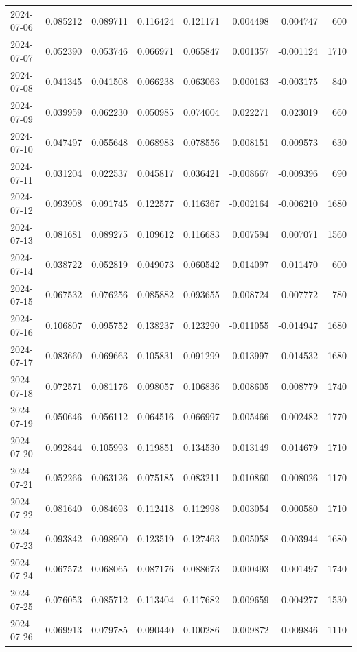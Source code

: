 \begin{tabular}{lrrrrrrr}
2024-07-06 & 0.085212 & 0.089711 & 0.116424 & 0.121171 & 0.004498 & 0.004747 & 600 \\
2024-07-07 & 0.052390 & 0.053746 & 0.066971 & 0.065847 & 0.001357 & -0.001124 & 1710 \\
2024-07-08 & 0.041345 & 0.041508 & 0.066238 & 0.063063 & 0.000163 & -0.003175 & 840 \\
2024-07-09 & 0.039959 & 0.062230 & 0.050985 & 0.074004 & 0.022271 & 0.023019 & 660 \\
2024-07-10 & 0.047497 & 0.055648 & 0.068983 & 0.078556 & 0.008151 & 0.009573 & 630 \\
2024-07-11 & 0.031204 & 0.022537 & 0.045817 & 0.036421 & -0.008667 & -0.009396 & 690 \\
2024-07-12 & 0.093908 & 0.091745 & 0.122577 & 0.116367 & -0.002164 & -0.006210 & 1680 \\
2024-07-13 & 0.081681 & 0.089275 & 0.109612 & 0.116683 & 0.007594 & 0.007071 & 1560 \\
2024-07-14 & 0.038722 & 0.052819 & 0.049073 & 0.060542 & 0.014097 & 0.011470 & 600 \\
2024-07-15 & 0.067532 & 0.076256 & 0.085882 & 0.093655 & 0.008724 & 0.007772 & 780 \\
2024-07-16 & 0.106807 & 0.095752 & 0.138237 & 0.123290 & -0.011055 & -0.014947 & 1680 \\
2024-07-17 & 0.083660 & 0.069663 & 0.105831 & 0.091299 & -0.013997 & -0.014532 & 1680 \\
2024-07-18 & 0.072571 & 0.081176 & 0.098057 & 0.106836 & 0.008605 & 0.008779 & 1740 \\
2024-07-19 & 0.050646 & 0.056112 & 0.064516 & 0.066997 & 0.005466 & 0.002482 & 1770 \\
2024-07-20 & 0.092844 & 0.105993 & 0.119851 & 0.134530 & 0.013149 & 0.014679 & 1710 \\
2024-07-21 & 0.052266 & 0.063126 & 0.075185 & 0.083211 & 0.010860 & 0.008026 & 1170 \\
2024-07-22 & 0.081640 & 0.084693 & 0.112418 & 0.112998 & 0.003054 & 0.000580 & 1710 \\
2024-07-23 & 0.093842 & 0.098900 & 0.123519 & 0.127463 & 0.005058 & 0.003944 & 1680 \\
2024-07-24 & 0.067572 & 0.068065 & 0.087176 & 0.088673 & 0.000493 & 0.001497 & 1740 \\
2024-07-25 & 0.076053 & 0.085712 & 0.113404 & 0.117682 & 0.009659 & 0.004277 & 1530 \\
2024-07-26 & 0.069913 & 0.079785 & 0.090440 & 0.100286 & 0.009872 & 0.009846 & 1110 \\

\end{tabular}
